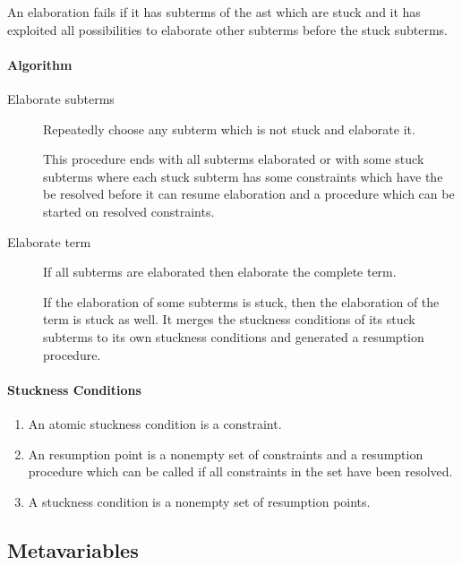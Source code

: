An elaboration fails if it has subterms of the ast which are stuck and it has
exploited all possibilities to elaborate other subterms before the stuck
subterms.


\paragraph{Algorithm}

\begin{description}
\item [Elaborate subterms]

    Repeatedly choose any subterm which is not stuck and elaborate it.

    This procedure ends with all subterms elaborated or with some stuck subterms
    where each stuck subterm has some constraints which have the be resolved
    before it can resume elaboration and a procedure which can be started on
    resolved constraints.

\item [Elaborate term]
    If all subterms are elaborated then elaborate the complete term.

    If the elaboration of some subterms is stuck, then the elaboration of the
    term is stuck as well. It merges the stuckness conditions of its stuck
    subterms to its own stuckness conditions and generated a resumption
    procedure.
\end{description}



\paragraph{Stuckness Conditions}

\begin{enumerate}
    \item
        An atomic stuckness condition is a constraint.

    \item An resumption point is a nonempty set of constraints and a
        resumption procedure which can be called if all constraints in the set
        have been resolved.

    \item A stuckness condition is a nonempty set of resumption points.
\end{enumerate}






\subsection{Metavariables}

